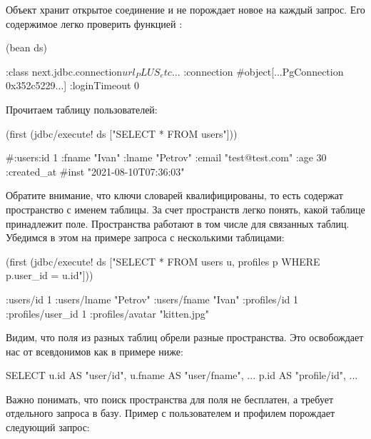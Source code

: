 Объект  хранит открытое соединение и не порождает новое на каждый запрос. Его содержимое легко проверить функцией :

\begin{english}
  \begin{clojure}
(bean ds)

{:class next.jdbc.connection$url_PLUS_etc$...
 :connection #object[...PgConnection 0x352c5229...]
 :loginTimeout 0}
  \end{clojure}
\end{english}

Прочитаем таблицу пользователей:

\begin{english}
  \begin{clojure}
(first (jdbc/execute! ds ["SELECT * FROM users"]))

#:users{:id 1
        :fname "Ivan"
        :lname "Petrov"
        :email "test@test.com"
        :age 30
        :created_at #inst "2021-08-10T07:36:03"}
  \end{clojure}
\end{english}

Обратите внимание, что ключи словарей квалифицированы, то есть содержат пространство с именем таблицы. За счет пространств легко понять, какой таблице принадлежит поле. Пространства работают в том числе для связанных таблиц. Убедимся в этом на примере запроса с несколькими таблицами:

\begin{english}
  \begin{clojure}
(first
  (jdbc/execute! ds
    ["SELECT *
      FROM users u, profiles p
      WHERE p.user_id = u.id"]))

{:users/id 1
 :users/lname "Petrov"
 :users/fname "Ivan"
 :profiles/id 1
 :profiles/user_id 1
 :profiles/avatar "kitten.jpg"}
  \end{clojure}
\end{english}

Видим, что поля из разных таблиц обрели разные пространства. Это освобождает нас от всевдонимов как в примере ниже:

\begin{english}
  \begin{sql}
SELECT
  u.id     AS "user/id",
  u.fname  AS "user/fname",
  ...
  p.id     AS "profile/id",
  ...
  \end{sql}
\end{english}

Важно понимать, что поиск пространства для поля не бесплатен, а требует отдельного запроса в базу. Пример с пользователем и профилем порождает следующий запрос:

